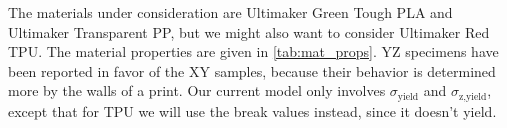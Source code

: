 The materials under consideration are Ultimaker Green Tough PLA and Ultimaker Transparent PP, but we might also want to consider Ultimaker Red TPU.
The material properties are given in \cref{tab:mat_props}.
YZ specimens have been reported in favor of the XY samples, because their behavior is determined more by the walls of a print. 
Our current model only involves $\sigma_\text{yield}$ and $\sigma_\text{z,yield}$, except that for TPU we will use the break values instead, since it doesn't yield.






